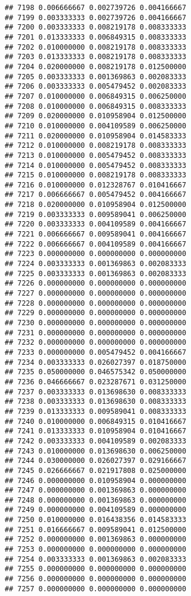 \documentclass[
]{article}
\begin{document}
\begin{verbatim}
## 7198 0.006666667 0.002739726 0.004166667
## 7199 0.003333333 0.002739726 0.004166667
## 7200 0.003333333 0.008219178 0.008333333
## 7201 0.013333333 0.006849315 0.008333333
## 7202 0.010000000 0.008219178 0.008333333
## 7203 0.013333333 0.008219178 0.008333333
## 7204 0.020000000 0.008219178 0.012500000
## 7205 0.003333333 0.001369863 0.002083333
## 7206 0.003333333 0.005479452 0.002083333
## 7207 0.010000000 0.006849315 0.006250000
## 7208 0.010000000 0.006849315 0.008333333
## 7209 0.020000000 0.010958904 0.012500000
## 7210 0.010000000 0.004109589 0.006250000
## 7211 0.020000000 0.010958904 0.014583333
## 7212 0.010000000 0.008219178 0.008333333
## 7213 0.010000000 0.005479452 0.008333333
## 7214 0.010000000 0.005479452 0.008333333
## 7215 0.010000000 0.008219178 0.008333333
## 7216 0.010000000 0.012328767 0.010416667
## 7217 0.006666667 0.005479452 0.004166667
## 7218 0.020000000 0.010958904 0.012500000
## 7219 0.003333333 0.009589041 0.006250000
## 7220 0.003333333 0.004109589 0.004166667
## 7221 0.006666667 0.009589041 0.004166667
## 7222 0.006666667 0.004109589 0.004166667
## 7223 0.000000000 0.000000000 0.000000000
## 7224 0.003333333 0.001369863 0.002083333
## 7225 0.003333333 0.001369863 0.002083333
## 7226 0.000000000 0.000000000 0.000000000
## 7227 0.000000000 0.000000000 0.000000000
## 7228 0.000000000 0.000000000 0.000000000
## 7229 0.000000000 0.000000000 0.000000000
## 7230 0.000000000 0.000000000 0.000000000
## 7231 0.000000000 0.000000000 0.000000000
## 7232 0.000000000 0.000000000 0.000000000
## 7233 0.000000000 0.005479452 0.004166667
## 7234 0.003333333 0.026027397 0.018750000
## 7235 0.050000000 0.046575342 0.050000000
## 7236 0.046666667 0.023287671 0.031250000
## 7237 0.003333333 0.013698630 0.008333333
## 7238 0.003333333 0.013698630 0.008333333
## 7239 0.013333333 0.009589041 0.008333333
## 7240 0.010000000 0.006849315 0.010416667
## 7241 0.013333333 0.010958904 0.010416667
## 7242 0.003333333 0.004109589 0.002083333
## 7243 0.010000000 0.013698630 0.006250000
## 7244 0.030000000 0.026027397 0.029166667
## 7245 0.026666667 0.021917808 0.025000000
## 7246 0.000000000 0.010958904 0.000000000
## 7247 0.000000000 0.001369863 0.000000000
## 7248 0.000000000 0.001369863 0.000000000
## 7249 0.000000000 0.004109589 0.000000000
## 7250 0.010000000 0.016438356 0.014583333
## 7251 0.016666667 0.009589041 0.012500000
## 7252 0.000000000 0.001369863 0.000000000
## 7253 0.000000000 0.000000000 0.000000000
## 7254 0.003333333 0.001369863 0.002083333
## 7255 0.000000000 0.000000000 0.000000000
## 7256 0.000000000 0.000000000 0.000000000
## 7257 0.000000000 0.000000000 0.000000000

\end{verbatim}
\end{document}
